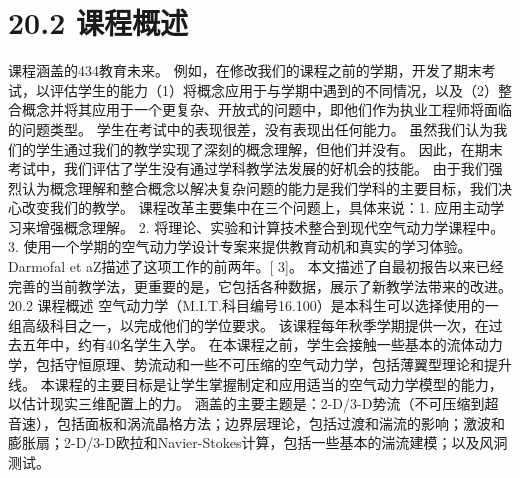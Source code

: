 \documentclass[UTF8,11pt,a4paper,openany,fontset=fandol]{ctexbook}
\begin{document}
\section{20.2 课程概述}
课程涵盖的434教育未来。 例如，在修改我们的课程之前的学期，开发了期末考试，以评估学生的能力（1）将概念应用于与学期中遇到的不同情况，以及（2）整合概念并将其应用于一个更复杂、开放式的问题中，即他们作为执业工程师将面临的问题类型。 学生在考试中的表现很差，没有表现出任何能力。 虽然我们认为我们的学生通过我们的教学实现了深刻的概念理解，但他们并没有。 因此，在期末考试中，我们评估了学生没有通过学科教学法发展的好机会的技能。 由于我们强烈认为概念理解和整合概念以解决复杂问题的能力是我们学科的主要目标，我们决心改变我们的教学。 课程改革主要集中在三个问题上，具体来说：1. 应用主动学习来增强概念理解。 2. 将理论、实验和计算技术整合到现代空气动力学课程中。 3. 使用一个学期的空气动力学设计专案来提供教育动机和真实的学习体验。 Darmofal et aZ描述了这项工作的前两年。[ 3]。 本文描述了自最初报告以来已经完善的当前教学法，更重要的是，它包括各种数据，展示了新教学法带来的改进。 20.2 课程概述 空气动力学（M.I.T.科目编号16.100）是本科生可以选择使用的一组高级科目之一，以完成他们的学位要求。 该课程每年秋季学期提供一次，在过去五年中，约有40名学生入学。 在本课程之前，学生会接触一些基本的流体动力学，包括守恒原理、势流动和一些不可压缩的空气动力学，包括薄翼型理论和提升线。 本课程的主要目标是让学生掌握制定和应用适当的空气动力学模型的能力，以估计现实三维配置上的力。 涵盖的主要主题是：2-D/3-D势流（不可压缩到超音速），包括面板和涡流晶格方法；边界层理论，包括过渡和湍流的影响；激波和膨胀扇；2-D/3-D欧拉和Navier-Stokes计算，包括一些基本的湍流建模；以及风洞测试。
\end{document}
